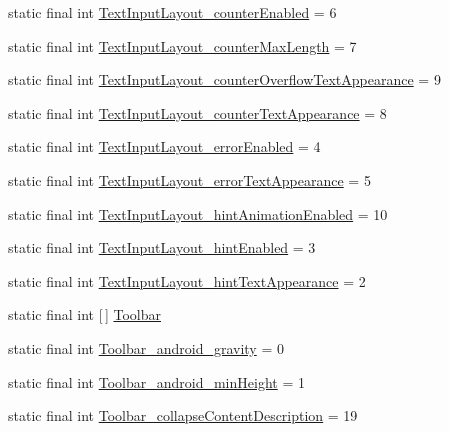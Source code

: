 \begin{DoxyCompactItemize}
\item 
static final int \hyperlink{classproject4_1_1xaria_1_1R_1_1styleable_abe72b67bbd7e17ba750c31e1e301e1e2}{Text\+Input\+Layout\+\_\+counter\+Enabled} = 6
\item 
static final int \hyperlink{classproject4_1_1xaria_1_1R_1_1styleable_a48eeaeeae4c8fc24f978d05e0930288c}{Text\+Input\+Layout\+\_\+counter\+Max\+Length} = 7
\item 
static final int \hyperlink{classproject4_1_1xaria_1_1R_1_1styleable_afcc440aa8b04e1782ae4bcdcab6d0d74}{Text\+Input\+Layout\+\_\+counter\+Overflow\+Text\+Appearance} = 9
\item 
static final int \hyperlink{classproject4_1_1xaria_1_1R_1_1styleable_a1317388c37206a92cac615b2e1bce472}{Text\+Input\+Layout\+\_\+counter\+Text\+Appearance} = 8
\item 
static final int \hyperlink{classproject4_1_1xaria_1_1R_1_1styleable_aa75e51a42b96d39550dcd078cc70a0d7}{Text\+Input\+Layout\+\_\+error\+Enabled} = 4
\item 
static final int \hyperlink{classproject4_1_1xaria_1_1R_1_1styleable_ad38bee143dd17467370cd16a83428514}{Text\+Input\+Layout\+\_\+error\+Text\+Appearance} = 5
\item 
static final int \hyperlink{classproject4_1_1xaria_1_1R_1_1styleable_a54817cff7e70ea97df2faf7653859bd4}{Text\+Input\+Layout\+\_\+hint\+Animation\+Enabled} = 10
\item 
static final int \hyperlink{classproject4_1_1xaria_1_1R_1_1styleable_ad51c0cb02e0a3966e40c64db946ea60a}{Text\+Input\+Layout\+\_\+hint\+Enabled} = 3
\item 
static final int \hyperlink{classproject4_1_1xaria_1_1R_1_1styleable_a309a9958fd85c366ec2a1e08ff0f0212}{Text\+Input\+Layout\+\_\+hint\+Text\+Appearance} = 2
\item 
static final int \mbox{[}$\,$\mbox{]} \hyperlink{classproject4_1_1xaria_1_1R_1_1styleable_af6c30f9e9e086f6bf4e510669443fa59}{Toolbar}
\item 
static final int \hyperlink{classproject4_1_1xaria_1_1R_1_1styleable_aaa01afab589b8e590f5d025a28cf7404}{Toolbar\+\_\+android\+\_\+gravity} = 0
\item 
static final int \hyperlink{classproject4_1_1xaria_1_1R_1_1styleable_ac5a3d253c3d18c7ab741bcfc47232df4}{Toolbar\+\_\+android\+\_\+min\+Height} = 1
\item 
static final int \hyperlink{classproject4_1_1xaria_1_1R_1_1styleable_a98b1b074efe3a521e01cbddeaaf5da0f}{Toolbar\+\_\+collapse\+Content\+Description} = 19
\item 

\end{DoxyCompactItemize}
